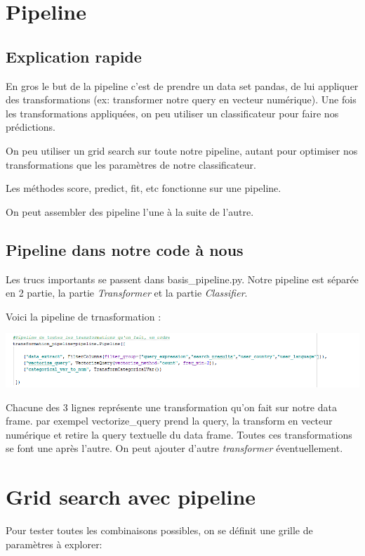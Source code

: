 \documentclass[12pt,french]{article}
\begin{document}
\section*{Pipeline}
\subsection*{Explication rapide}
En gros le but de la pipeline c'est de prendre un data set pandas, de lui appliquer des transformations (ex: transformer notre query en vecteur numérique). Une fois les transformations appliquées, on peu utiliser un classificateur pour faire nos prédictions. 

On peu utiliser un grid search sur toute notre pipeline, autant pour optimiser nos transformations que les paramètres de notre classificateur.

Les méthodes score, predict, fit, etc fonctionne sur une pipeline.

On peut assembler des pipeline l'une à la suite de l'autre.

\subsection*{Pipeline dans notre code à nous}
Les trucs importants se passent dans basis\_pipeline.py. Notre pipeline est séparée en 2 partie, la partie \emph{Transformer} et la partie \emph{Classifier}. 

Voici la pipeline de trnasformation :

\includegraphics[width=\linewidth]{trans_pipe}

Chacune des 3 lignes représente une transformation qu'on fait sur notre data frame. par exempel vectorize\_query prend la query, la transform en vecteur numérique et retire la query textuelle du data frame. Toutes ces transformations se font une après l'autre. On peut ajouter d'autre \emph{transformer} éventuellement.


\section*{Grid search avec pipeline}

Pour tester toutes les combinaisons possibles, on se définit une grille de paramètres à explorer:
\end{document}
